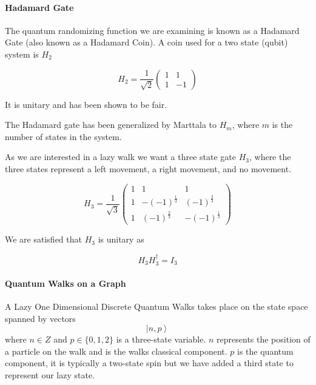 \documentclass[a0,portrait]{a0poster}
\newcommand{\ket}[1]{\left| #1\right\rangle}
\begin{document}
\begin{center}
{\paragraph{Hadamard Gate}

The quantum randomizing function we are examining is known as a Hadamard Gate (also known as a Hadamard Coin). A coin used for a two state (qubit) system is $H_2$ 

\begin{equation}
H_2 = \dfrac{1}{\sqrt{2}} \begin{pmatrix}
  1 & 1 \\
  1 & -1 
\end{pmatrix}
\label{eq:1}
\end{equation}

It is unitary and has been shown\cite{Ke:2003} to be fair. 

The Hadamard gate has been generalized by Marttala\cite{Ma:2007} to $H_m$, where $m$ is the number of states in the system. 

As we are interested in a lazy walk we want a three state gate $H_3$, where the three states represent a left movement, a right movement, and no movement.

\begin{equation}
H_3 = \dfrac{1}{\sqrt{3}} \begin{pmatrix}
  1 & 1 & 1 \\
  1 & -(-1)^{\frac{1}{3}} & (-1)^{\frac{2}{3}} \\
  1 & (-1)^{\frac{2}{3}} & -(-1)^{\frac{1}{3}}
\end{pmatrix}
\label{eq:5}
\end{equation}

We are satisfied that $H_3$ is unitary as 

\begin{equation}
H_{3}H_{3}^{\dagger} = I_3
\label{eq:6}
\end{equation}

\paragraph{Quantum Walks on a Graph}

A Lazy One Dimensional Discrete Quantum Walks takes place 
on the state space spanned by vectors
\begin{equation}
\ket{n,p}
\label{eq:7}
\end{equation}
where $n\in Z$
and $p\in \{0,1,2\}$ is a three-state variable. $n$ represents the position of a particle on the walk and is the walks classical component. $p$ is the quantum component, it is typically a two-state spin but we have added a third state to represent our lazy state. 

}
\end{center}
\end{document}
